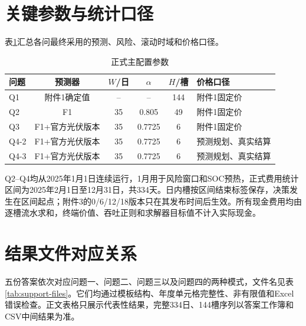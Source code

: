 \documentclass[UTF8,12pt,a4paper]{ctexart}
\theoremstyle{remark}
\begin{document}
\section{关键参数与统计口径}
表\ref{tab:appendix-params}汇总各问最终采用的预测、风险、滚动时域和价格口径。
\begin{table}[H]\centering\small
\caption{正式主配置参数}\label{tab:appendix-params}
\begin{tabular}{lccccl}\toprule
问题&预测器&$W$/日&$\alpha$&$H$/槽&价格口径\\\midrule
Q1&附件1确定值&--&--&144&附件1固定价\\
Q2&F1&35&0.805&49&附件1固定价\\
Q3&F1+官方光伏版本&35&0.7725&6&附件1固定价\\
Q4-2&F1+官方光伏版本&35&0.7725&6&预测规划、真实结算\\
Q4-3&F1+官方光伏版本&35&0.7725&6&预测规划、真实结算\\\bottomrule
\end{tabular}\end{table}

Q2--Q4均从2025年1月1日连续运行，1月用于风险窗口和SOC预热，正式费用统计区间为2025年2月1日至12月31日，共334天。日内槽按区间结束标签保存，决策发生在区间起点；附件3的0/6/12/18版本只在其发布时间后生效。所有现金费用均由逐槽流水求和，终端价值、吞吐正则和求解器目标值不计入实际现金。

\section{结果文件对应关系}
五份答案依次对应问题一、问题二、问题三以及问题四的两种模式，文件名见表\ref{tab:support-files}。它们均通过模板结构、年度单元格完整性、非有限值和Excel错误检查。正文表格只展示代表性结果，完整334日、144槽序列以答案工作簿和CSV中间结果为准。
\end{document}
